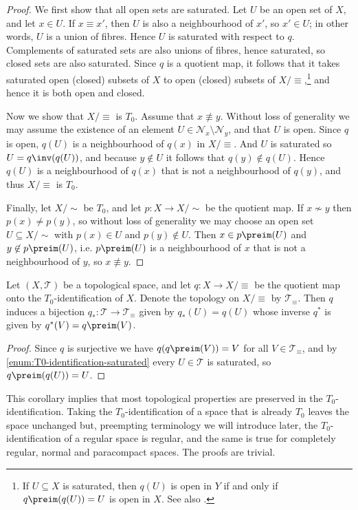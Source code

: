 \documentclass[article, a4paper, 11pt, oneside]{memoir}
\numberwithin{equation}{chapter}
\newcommand{\calN}{\mathcal{N}}
\newcommand{\nhoodfilter}[1]{\calN_{#1}}
\newcommand{\calT}{\mathcal{T}}
\begin{document}
\begin{proof}
    We first show that all open sets are saturated. Let $U$ be an open set of $X$, and let $x \in U$. If $x \equiv x'$, then $U$ is also a neighbourhood of $x'$, so $x' \in U$; in other words, $U$ is a union of fibres. Hence $U$ is saturated with respect to $q$. Complements of saturated sets are also unions of fibres, hence saturated, so closed sets are also saturated. Since $q$ is a quotient map, it follows that it takes saturated open (closed) subsets of $X$ to open (closed) subsets of $X/{\equiv}$,\footnote{If $U \subseteq X$ is saturated, then $q(U)$ is open in $Y$ if and only if $q\preim(q(U)) = U$ is open in $X$. See also \textcite[Proposition~3.60]{leetopological}.} and hence it is both open and closed.

    Now we show that $X/{\equiv}$ is $T_0$. Assume that $x \not\equiv y$. Without loss of generality we may assume the existence of an element $U \in \nhoodfilter{x} \setminus \nhoodfilter{y}$, and that $U$ is open. Since $q$ is open, $q(U)$ is a neighbourhood of $q(x)$ in $X/{\equiv}$. And $U$ is saturated so $U = q\inv(q(U))$, and because $y \not\in U$ it follows that $q(y) \not\in q(U)$. Hence $q(U)$ is a neighbourhood of $q(x)$ that is not a neighbourhood of $q(y)$, and thus $X/{\equiv}$ is $T_0$.

    Finally, let $X/{\sim}$ be $T_0$, and let $p \colon X \to X/{\sim}$ be the quotient map. If $x \not\sim y$ then $p(x) \neq p(y)$, so without loss of generality we may choose an open set $U \subseteq X/{\sim}$ with $p(x) \in U$ and $p(y) \not\in U$. Then $x \in p\preim(U)$ and $y \not\in p\preim(U)$, i.e. $p\preim(U)$ is a neighbourhood of $x$ that is not a neighbourhood of $y$, so $x \not\equiv y$.
\end{proof}


\begin{corollary}
    Let $(X,\calT)$ be a topological space, and let $q \colon X \to X/{\equiv}$ be the quotient map onto the $T_0$-identification of $X$. Denote the topology on $X/{\equiv}$ by $\calT_\equiv$. Then $q$ induces a bijection $q_* \colon \calT \to \calT_\equiv$ given by $q_*(U) = q(U)$ whose inverse $q^*$ is given by $q^*(V) = q\preim(V)$.
\end{corollary}

\begin{proof}
    Since $q$ is surjective we have $q(q\preim(V)) = V$ for all $V \in \calT_\equiv$, and by \cref{enum:T0-identification-saturated} every $U \in \calT$ is saturated, so $q\preim(q(U)) = U$.
\end{proof}
%
This corollary implies that most topological properties are preserved in the $T_0$-identification. Taking the $T_0$-identification of a space that is already $T_0$ leaves the space unchanged but, preempting terminology we will introduce later, the $T_0$-identification of a regular space is regular, and the same is true for completely regular, normal and paracompact spaces. The proofs are trivial.
\end{document}
